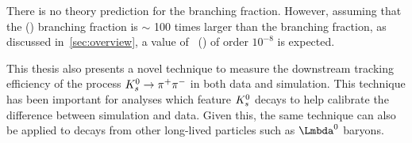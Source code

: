 There is no theory prediction for the \Lbpi branching fraction. However, assuming that the \Lb\to\proton\pim\jpsi(\to\mumu) branching fraction is $\sim$ 100 times larger than the \Lbpi branching fraction, as discussed in~\autoref{sec:overview}, a value of \BF~(\Lbpi) of order $10^{-8}$ is expected.


This thesis also presents a novel technique to measure the downstream tracking efficiency of the process ${{K}^0_{s}}\rightarrow{\ensuremath{{\pi}^+}}{\ensuremath{{\pi}^-}}$ in both data and simulation. This technique has been important for analyses which feature ${{K}^0_{s}}$ decays to help calibrate the difference between simulation and data. Given this, the same technique can also be applied to decays from other long-lived particles such as $\Lz$ baryons.










